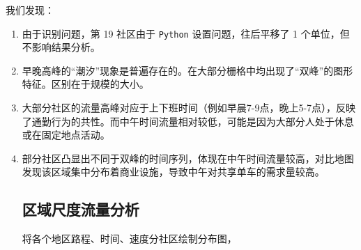 \documentclass[12pt,a4paper,oneside]{ctexart}
\begin{document}
我们发现：
\begin{enumerate}
\item 由于识别问题，第 19 社区由于 \texttt{Python} 设置问题，往后平移了 1 个单位，但不影响结果分析。

\item 早晚高峰的“潮汐”现象是普遍存在的。在大部分栅格中均出现了“双峰”的图形特征。区别在于规模的大小。

\item 大部分社区的流量高峰对应于上下班时间（例如早晨7-9点，晚上5-7点），反映了通勤行为的共性。而中午时间流量相对较低，可能是因为大部分人处于休息或在固定地点活动。

\item 部分社区凸显出不同于双峰的时间序列，体现在中午时间流量较高，对比地图发现该区域集中分布着商业设施，导致中午对共享单车的需求量较高。


\subsection{区域尺度流量分析}

将各个地区路程、时间、速度分社区绘制分布图，
\begin{figure}[H]
    \centering
    \hfill
\end{figure}
\end{enumerate}
\end{document}
